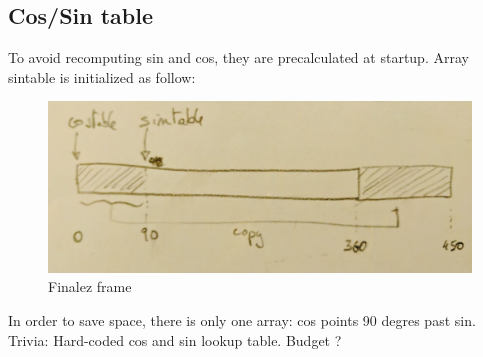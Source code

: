 \subsection{Cos/Sin table}
To avoid recomputing sin and cos, they are precalculated at startup. Array sintable is initialized as follow:\\
\par

\begin{minipage}{\textwidth}

\end{minipage}


\begin{figure}[H]
 \centering
  \includegraphics[width=\textwidth]{imgs/cos_sin_table.png}
 \caption{Finalez frame} 
\end{figure}

In order to save space, there is only one array: cos points 90 degres past sin.\\


Trivia: Hard-coded cos and sin lookup table. Budget ?
